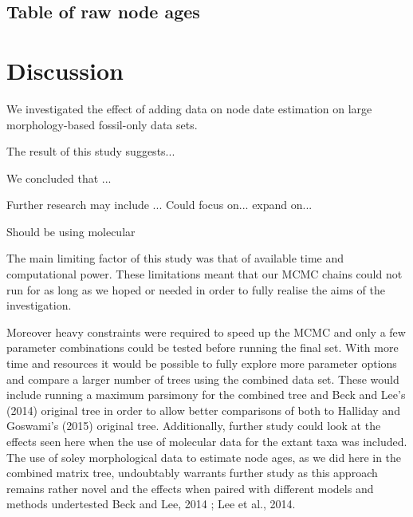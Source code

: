 \documentclass[11pt,letterpaper]{article}
\begin{document}

\subsection{Table of raw node ages}


\newpage

\section{Discussion}

We investigated the effect of adding data on node date estimation on large morphology-based fossil-only data sets.

The result of this study suggests...

We concluded that ...

Further research may include ... Could focus on... expand on...

Should be using molecular \citep{puttick2016dating} %

The main limiting factor of this study was that of available time and computational power. %
These limitations meant that our MCMC chains could not run for as long as we hoped or needed in order to fully realise the aims of the investigation. %

Moreover heavy constraints were required to speed up the MCMC and only a few parameter combinations could be tested before running the final set.
With more time and resources it would be possible to fully explore more parameter options and compare a larger number of trees using the combined data set.
These would include running a maximum parsimony for the combined tree and Beck and Lee's (2014) original tree in order to allow better comparisons of both to Halliday and Goswami's (2015) original tree. %
Additionally, further study could look at the effects seen here when the use of molecular data for the extant taxa was included.
The use of soley morphological data to estimate node ages, as we did here in the combined matrix tree, undoubtably warrants further study as this approach remains rather novel and the effects when paired with different models and methods undertested Beck and Lee, 2014 ;  Lee et al., 2014. 
\end{document}
